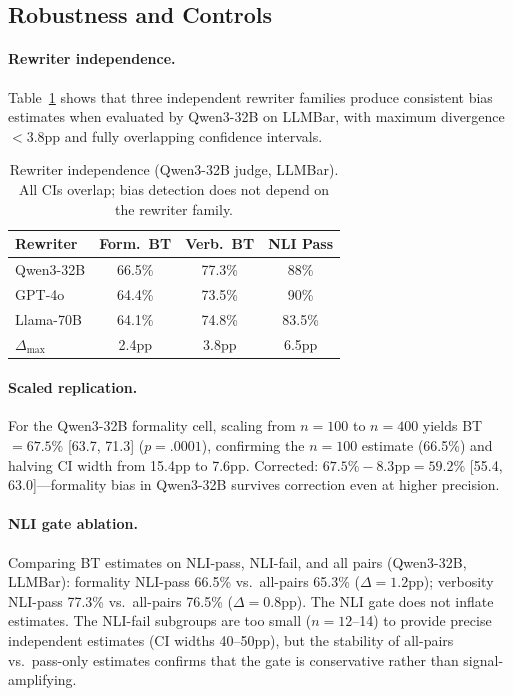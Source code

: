 \documentclass[11pt]{article}
\begin{document}
\subsection{Robustness and Controls}

\paragraph{Rewriter independence.} Table~\ref{tab:rewriter} shows that three independent rewriter families produce consistent bias estimates when evaluated by Qwen3-32B on LLMBar, with maximum divergence $<3.8$pp and fully overlapping confidence intervals.

\begin{table}[t]
\centering
\small
\begin{tabular}{lccc}
\toprule
\textbf{Rewriter} & \textbf{Form.\ BT} & \textbf{Verb.\ BT} & \textbf{NLI Pass} \\
\midrule
Qwen3-32B & 66.5\% & 77.3\% & 88\% \\
GPT-4o & 64.4\% & 73.5\% & 90\% \\
Llama-70B & 64.1\% & 74.8\% & 83.5\% \\
\midrule
$\Delta_{\max}$ & 2.4pp & 3.8pp & 6.5pp \\
\bottomrule
\end{tabular}
\caption{Rewriter independence (Qwen3-32B judge, LLMBar). All CIs overlap; bias detection does not depend on the rewriter family.}
\label{tab:rewriter}
\end{table}

\paragraph{Scaled replication.} For the Qwen3-32B formality cell, scaling from $n=100$ to $n=400$ yields BT$=67.5\%$ [63.7, 71.3] ($p=.0001$), confirming the $n=100$ estimate (66.5\%) and halving CI width from 15.4pp to 7.6pp. Corrected: $67.5\% - 8.3\text{pp} = 59.2\%$ [55.4, 63.0]---formality bias in Qwen3-32B survives correction even at higher precision.

\paragraph{NLI gate ablation.} Comparing BT estimates on NLI-pass, NLI-fail, and all pairs (Qwen3-32B, LLMBar): formality NLI-pass 66.5\% vs.\ all-pairs 65.3\% ($\Delta=1.2$pp); verbosity NLI-pass 77.3\% vs.\ all-pairs 76.5\% ($\Delta=0.8$pp). The NLI gate does not inflate estimates. The NLI-fail subgroups are too small ($n=12$--14) to provide precise independent estimates (CI widths 40--50pp), but the stability of all-pairs vs.\ pass-only estimates confirms that the gate is conservative rather than signal-amplifying.
\end{document}
